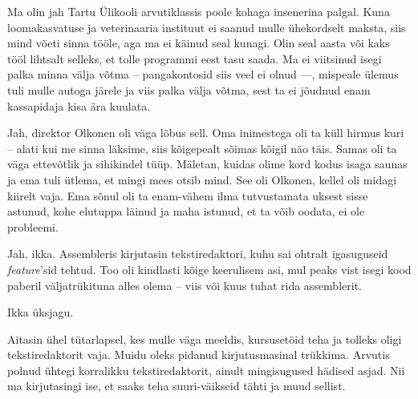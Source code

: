 
Ma olin jah Tartu Ülikooli arvutiklassis poole kohaga insenerina palgal. 
Kuna loomakasvatuse ja veterinaaria instituut ei saanud mulle 
ühekordselt maksta, siis mind võeti sinna tööle, aga ma ei käinud 
seal kunagi. Olin seal aasta või kaks tööl lihtsalt selleks, et tolle 
programmi eest tasu saada. Ma ei viitsinud isegi palka minna välja 
võtma -- pangakontosid siis veel ei olnud ---, mispeale ülemus tuli mulle autoga järele ja 
viis palka välja võtma, sest ta ei jõudnud enam kassapidaja kisa ära 
kuulata.


Jah, direktor Olkonen oli väga lõbus sell. Oma inimestega oli ta küll hirmus 
kuri -- alati kui me sinna läksime, siis kõigepealt sõimas kõigil näo täis. 
Samas oli ta väga ettevõtlik ja sihikindel tüüp. Mäletan, kuidas olime kord kodus isaga saunas ja 
ema tuli ütlema, et mingi mees otsib mind. See oli Olkonen, kellel
oli midagi kiirelt vaja. Ema sõnul oli ta enam-vähem ilma 
tutvustamata uksest sisse astunud, kohe elutuppa läinud ja maha istunud, et ta 
võib oodata, ei ole probleemi.


Jah, ikka. Assembleris kirjutasin tekstiredaktori, kuhu sai 
ohtralt igasuguseid \emph{feature}'sid tehtud. Too oli kindlasti kõige 
keerulisem asi, mul peaks vist isegi kood paberil väljatrükituna 
alles olema -- viis või kuus tuhat rida assemblerit. 


Ikka üksjagu. 


Aitasin ühel tütarlapsel, kes mulle väga meeldis, kursusetöid teha 
ja tolleks oligi tekstiredaktorit vaja. Muidu oleks pidanud 
kirjutusmasinal trükkima. Arvutis polnud ühtegi korralikku tekstiredaktorit, ainult mingisugused hädised asjad. Nii ma kirjutasingi ise,
et saaks teha suuri-väikseid tähti ja muud sellist.


